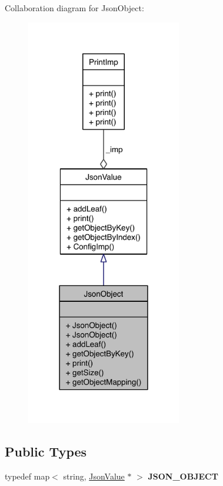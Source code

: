 Collaboration diagram for Json\-Object\-:
\nopagebreak
\begin{figure}[H]
\begin{center}
\leavevmode
\includegraphics[width=192pt]{class_json_object__coll__graph}
\end{center}
\end{figure}
\subsection*{Public Types}
\begin{DoxyCompactItemize}
\item 
\hypertarget{class_json_object_a83a1255aafe7ac715e6a252e5f3f95b9}{typedef map$<$ string, \hyperlink{class_json_value}{Json\-Value} $\ast$ $>$ {\bfseries J\-S\-O\-N\-\_\-\-O\-B\-J\-E\-C\-T}}\label{class_json_object_a83a1255aafe7ac715e6a252e5f3f95b9}

\end{DoxyCompactItemize}
